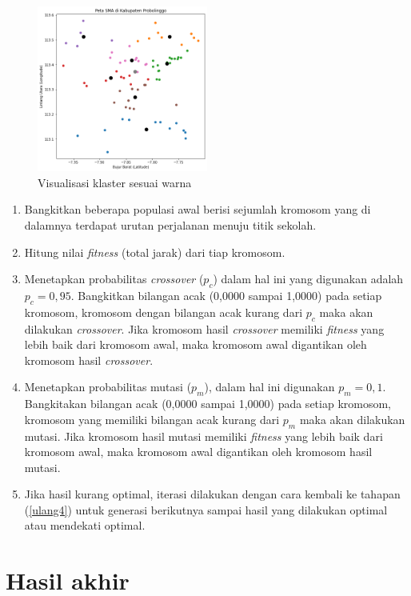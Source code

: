 \begin{figure}[H]
	\centering
	\includegraphics[width=0.5\textwidth]{Gambar/hasil klaster.png}
	\caption{Visualisasi klaster sesuai warna}
	\label{fig:hasilklas}
\end{figure}

\begin{enumerate}
	\item Bangkitkan beberapa populasi awal berisi sejumlah kromosom yang di dalamnya terdapat urutan perjalanan menuju titik sekolah.
	\item \label{ulang4} Hitung nilai \textit{fitness} (total jarak) dari tiap kromosom.
	\item Menetapkan probabilitas \textit{crossover} ($p_c$) dalam hal ini yang digunakan adalah $p_c=0,95$. Bangkitkan bilangan acak (0,0000 sampai 1,0000) pada setiap kromosom, kromosom dengan bilangan acak kurang dari $p_c$ maka akan dilakukan \textit{crossover}. Jika kromosom hasil \textit{crossover} memiliki \textit{fitness} yang lebih baik  dari kromosom awal, maka kromosom awal digantikan oleh kromosom hasil \textit{crossover}.
	\item Menetapkan probabilitas mutasi ($p_m$), dalam hal ini digunakan $p_m=0,1$. Bangkitakan bilangan acak (0,0000 sampai 1,0000) pada setiap kromosom, kromosom yang memiliki bilangan acak kurang dari $p_m$ maka akan dilakukan mutasi. Jika kromosom hasil mutasi memiliki \textit{fitness} yang lebih baik dari kromosom awal, maka kromosom awal digantikan oleh kromosom hasil mutasi.
	\item Jika hasil kurang optimal, iterasi dilakukan dengan cara kembali ke tahapan (\ref{ulang4}) untuk generasi berikutnya sampai hasil yang dilakukan optimal atau mendekati optimal.
\end{enumerate}

\section{Hasil akhir}

